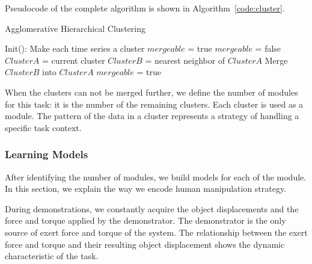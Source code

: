 Pseudocode of the complete algorithm is shown in Algorithm~\ref{code:cluster}.

\begin{algorithm}
  \caption{Agglomerative Hierarchical Clustering}
  \begin{algorithmic}[1]
    \State Init(): Make each time series a cluster\;
    \State $mergeable$ = true\;
      \State $mergeable$ = false\;
        \State $ClusterA$ = current cluster\;
        \State $ClusterB$ = nearest neighbor of $ClusterA$\;
            \State Merge $ClusterB$ into $ClusterA$\;
            \State $mergeable$ = true\;
        \EndIf
      \EndFor
    \EndWhile
    \EndFunction
  \end{algorithmic}
  \label{code:cluster}
\end{algorithm}



When the clusters can not be merged further, we define the number of modules for this task: it is the number of the remaining clusters. Each cluster is used as a module. The pattern of the data in a cluster represents a strategy of handling a specific task context.

\subsubsection{Learning Models}
\label{sec:model}
After identifying the number of modules, we build models for each of the module. In this section, we explain the way we encode human manipulation strategy.

During demonstrations, we constantly acquire the object displacements and the force and torque applied by the demonstrator. The demonstrator is the only source of exert force and torque of the system. The relationship between the exert force and torque and their resulting object displacement shows the dynamic characteristic of the task.

